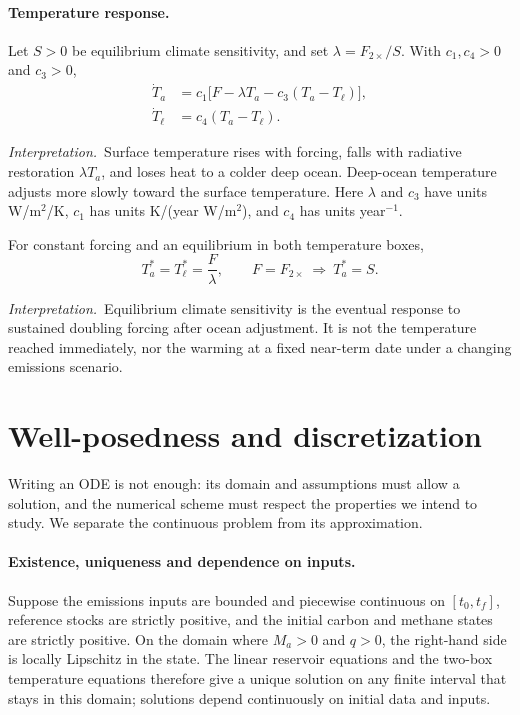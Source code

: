 \documentclass[11pt,a4paper]{article}
\newcommand{\interp}{\par\smallskip\noindent\textit{Interpretation.}\ }
\begin{document}
\paragraph{Temperature response.}
Let $S>0$ be equilibrium climate sensitivity, and set
$\lambda=F_{2\times}/S$. With $c_1,c_4>0$ and $c_3>0$,
\begin{equation}\label{eq:temperatures}
 \begin{aligned}
 \dot T_a&=c_1\big[F-\lambda T_a-c_3(T_a-T_\ell)\big],\\
 \dot T_\ell&=c_4(T_a-T_\ell).
 \end{aligned}
\end{equation}
\interp Surface temperature rises with forcing, falls with radiative
restoration $\lambda T_a$, and loses heat to a colder deep ocean.
Deep-ocean temperature adjusts more slowly toward the surface temperature.
Here $\lambda$ and $c_3$ have units W/m$^2$/K, $c_1$ has units
K/(year W/m$^2$), and $c_4$ has units year$^{-1}$.

For constant forcing and an equilibrium in both temperature boxes,
\begin{equation}\label{eq:equilibrium}
 T_a^*=T_\ell^*=\frac{F}{\lambda},
 \qquad F=F_{2\times}\ \Longrightarrow\ T_a^*=S.
\end{equation}
\interp Equilibrium climate sensitivity is the eventual response to
sustained doubling forcing after ocean adjustment. It is not the
temperature reached immediately, nor the warming at a fixed near-term
date under a changing emissions scenario.

\section{Well-posedness and discretization}
Writing an ODE is not enough: its domain and assumptions must allow a
solution, and the numerical scheme must respect the properties we intend
to study. We separate the continuous problem from its approximation.

\paragraph{Existence, uniqueness and dependence on inputs.}
Suppose the emissions inputs are bounded and piecewise continuous on
$[t_0,t_f]$, reference stocks are strictly positive, and the initial carbon
and methane states are strictly positive. On the domain where $M_a>0$
and $q>0$, the right-hand side is locally Lipschitz in the state.
The linear reservoir equations and the two-box temperature equations
therefore give a unique solution on any finite interval that stays in
this domain; solutions depend continuously on initial data and inputs.
\end{document}
